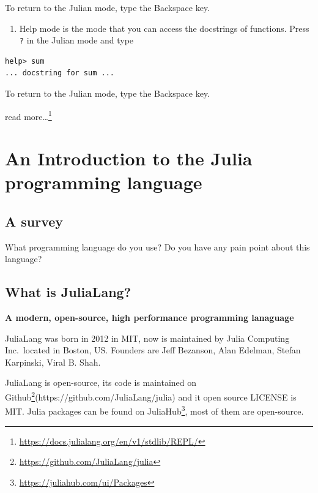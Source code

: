 \documentclass[
  notoc %
]{tufte-book}
\DeclareRobustCommand{\href}[2]{#2\footnote{\url{#1}}}
\providecommand{\tightlist}{%
  \setlength{\itemsep}{0pt}\setlength{\parskip}{0pt}
}
\newcommand{\passthrough}[1]{#1}
\begin{document}
To return to the Julian mode, type the Backspace key.

\begin{enumerate}
\def\labelenumi{\arabic{enumi}.}
\setcounter{enumi}{3}
\tightlist
\item
  Help mode is the mode that you can access the docstrings of functions.
  Press \passthrough{\lstinline!?!} in the Julian mode and type
\end{enumerate}

\begin{lstlisting}
help> sum
... docstring for sum ...
\end{lstlisting}

To return to the Julian mode, type the Backspace key.

\href{https://docs.julialang.org/en/v1/stdlib/REPL/}{read more\ldots{}}

\hypertarget{an-introduction-to-the-julia-programming-language}{%
\section{An Introduction to the Julia programming
language}\label{an-introduction-to-the-julia-programming-language}}

\hypertarget{a-survey}{%
\subsection{A survey}\label{a-survey}}

What programming language do you use? Do you have any pain point about
this language?

\hypertarget{what-is-julialang}{%
\subsection{What is JuliaLang?}\label{what-is-julialang}}

\textbf{A modern, open-source, high performance programming lanaguage}

JuliaLang was born in 2012 in MIT, now is maintained by Julia Computing
Inc.~located in Boston, US. Founders are Jeff Bezanson, Alan Edelman,
Stefan Karpinski, Viral B. Shah.

JuliaLang is open-source, its code is maintained on
\href{https://github.com/JuliaLang/julia}{Github}(https://github.com/JuliaLang/julia)
and it open source LICENSE is MIT. Julia packages can be found on
\href{https://juliahub.com/ui/Packages}{JuliaHub}, most of them are
open-source.
\end{document}
